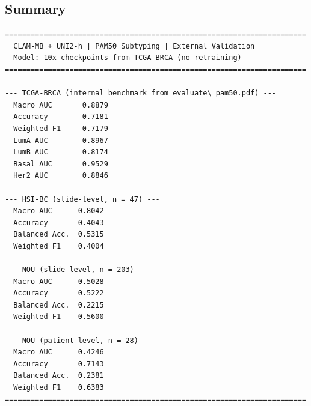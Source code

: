 \documentclass[11pt]{article}
\begin{document}
    

    \hypertarget{summary}{%
\subsection{Summary}\label{summary}}

    \begin{Verbatim}[commandchars=\\\{\}]
======================================================================
  CLAM-MB + UNI2-h | PAM50 Subtyping | External Validation
  Model: 10x checkpoints from TCGA-BRCA (no retraining)
======================================================================

--- TCGA-BRCA (internal benchmark from evaluate\_pam50.pdf) ---
  Macro AUC       0.8879
  Accuracy        0.7181
  Weighted F1     0.7179
  LumA AUC        0.8967
  LumB AUC        0.8174
  Basal AUC       0.9529
  Her2 AUC        0.8846

--- HSI-BC (slide-level, n = 47) ---
  Macro AUC      0.8042
  Accuracy       0.4043
  Balanced Acc.  0.5315
  Weighted F1    0.4004

--- NOU (slide-level, n = 203) ---
  Macro AUC      0.5028
  Accuracy       0.5222
  Balanced Acc.  0.2215
  Weighted F1    0.5600

--- NOU (patient-level, n = 28) ---
  Macro AUC      0.4246
  Accuracy       0.7143
  Balanced Acc.  0.2381
  Weighted F1    0.6383
======================================================================
    \end{Verbatim}


    
    
    
\end{document}
